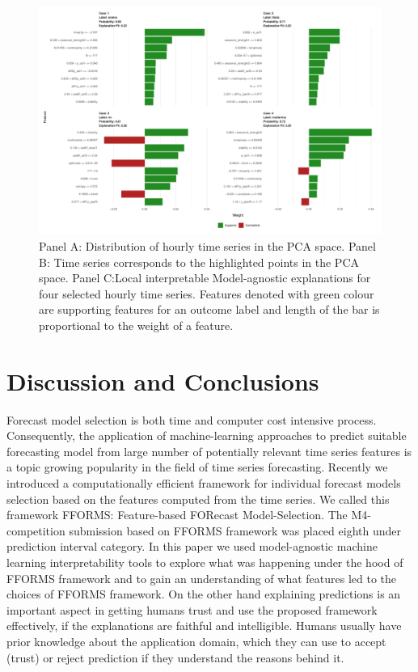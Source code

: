 \documentclass[11pt,a4paper,]{article}
\begin{document}
\begin{figure}[h]

{\centering \includegraphics{figures/hourlylime2-1} 

}

\caption{Panel A: Distribution of hourly time series in the PCA space. Panel B: Time series corresponds to the highlighted points in the PCA space. Panel C:Local interpretable Model-agnostic explanations for four selected hourly time series. Features denoted with green colour are supporting features for an outcome label and length of the bar is proportional to the weight of a feature.}\label{fig:hourlylime2}
\end{figure}

\clearpage

\section{Discussion and Conclusions}\label{conclusions}

Forecast model selection is both time and computer cost intensive
process. Consequently, the application of machine-learning approaches to
predict suitable forecasting model from large number of potentially
relevant time series features is a topic growing popularity in the field
of time series forecasting. Recently we introduced a computationally
efficient framework for individual forecast models selection based on
the features computed from the time series. We called this framework
FFORMS: Feature-based FORecast Model-Selection. The M4-competition
submission based on FFORMS framework was placed eighth under prediction
interval category. In this paper we used model-agnostic machine learning
interpretability tools to explore what was happening under the hood of
FFORMS framework and to gain an understanding of what features led to
the choices of FFORMS framework. On the other hand explaining
predictions is an important aspect in getting humans trust and use the
proposed framework effectively, if the explanations are faithful and
intelligible. Humans usually have prior knowledge about the application
domain, which they can use to accept (trust) or reject prediction if
they understand the reasons behind it.
\end{document}
